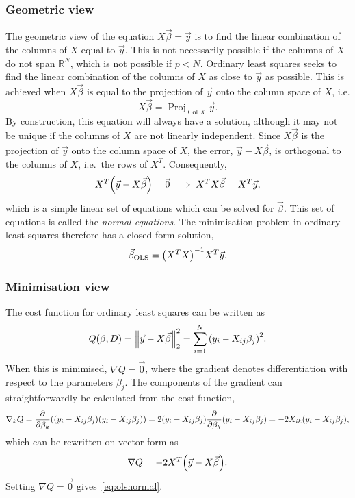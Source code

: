 \documentclass[11pt,british,a4paper]{article}
\DeclareMathOperator{\Proj}{Proj}
\DeclareMathOperator{\Col}{Col}
\numberwithin{equation}{section}
\begin{document}
\subsubsection{Geometric view}
The geometric view of the equation \(X\vec{\beta}=\vec{y}\) is to find the linear combination of the columns of \(X\) equal to \(\vec{y}\).
This is not necessarily possible if the columns of \(X\) do not span \(\mathbb{R}^N\), which is not possible if \(p<N\).
Ordinary least squares seeks to find the linear combination of the columns of \(X\) as close to \(\vec{y}\) as possible.
This is achieved when \(X\vec{\beta}\) is equal to the projection of \(\vec{y}\) onto the column space of \(X\), i.e.
\begin{equation}
    X\vec{\beta} = \Proj_{\Col{X}}{\vec{y}}.
\end{equation}
By construction, this equation will always have a solution, although it may not be unique if the columns of \(X\) are not linearly independent.
Since \(X\vec{\beta}\) is the projection of \(\vec{y}\) onto the column space of \(X\), the error, \(\vec{y}-X\vec{\beta}\), is orthogonal to the columns of \(X\), i.e.\ the rows of \(X^T\).
Consequently,
\begin{equation}
    X^T\qty(\vec{y}-X\vec{\beta}) = \vec{0}
    \implies
    X^T X \vec{\beta} = X^T \vec{y},\label{eq:olsnormal}
\end{equation}
which is a simple linear set of equations which can be solved for \(\vec{\beta}\).
This set of equations is called the \emph{normal equations}.
The minimisation problem in ordinary least squares therefore has a closed form solution,
\begin{equation}
    \vec{\beta}_{\text{OLS}} = \qty(X^T X)^{-1} X^T \vec{y}.
\end{equation}

\subsubsection{Minimisation view}
The cost function for ordinary least squares can be written as
\begin{equation}
    Q(\beta;D) = \norm{\vec{y}-X\vec{\beta}}_2^2
               = \sum_{i=1}^N \qty(y_i - X_{ij}\beta_j)^2.
\end{equation}
When this is minimised, \(\nabla Q = \vec{0}\), where the gradient denotes differentiation with respect to the parameters \(\beta_j\).
The components of the gradient can straightforwardly be calculated from the cost function,
\begin{equation}
    \nabla_k Q = \pdv{\beta_k}(\qty(y_i - X_{ij}\beta_j)\qty(y_i - X_{ij}\beta_j))
               = 2\qty(y_i-X_{ij}\beta_j) \pdv{\beta_k}(y_i-X_{ij}\beta_j)
               = -2X_{ik}\qty(y_i-X_{ij}\beta_j),\label{eq:olsgradcomp}
\end{equation}
which can be rewritten on vector form as
\begin{equation}
    \nabla Q = -2X^T\qty(\vec{y}-X\vec{\beta}).\label{eq:olsgrad}
\end{equation}
Setting \(\nabla Q = \vec{0}\) gives~\vref{eq:olsnormal}.
\end{document}
